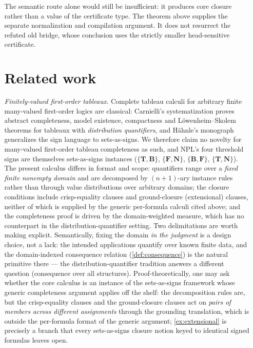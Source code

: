 \documentclass[11pt,a4paper]{article}
\theoremstyle{definition}
\newcommand{\vT}{\mathbf{T}}
\newcommand{\vF}{\mathbf{F}}
\newcommand{\vB}{\mathbf{B}}
\newcommand{\vN}{\mathbf{N}}
\begin{document}
The semantic route alone would still be insufficient: it produces core
closure rather than a value of the certificate type.  The theorem above
supplies the separate normalization and compilation argument.  It does not
resurrect the refuted old bridge, whose conclusion uses the strictly
smaller head-sensitive certificate.

\section{Related work}\label{sec:related}

\emph{Finitely-valued first-order tableaux.} Complete tableau calculi for
arbitrary finite many-valued first-order logics are classical:
Carnielli's systematization \cite{carnielli1987systematization} proves
abstract completeness, model existence, compactness and
L\"owenheim--Skolem theorems for tableaux with \emph{distribution
quantifiers}, and H\"ahnle's monograph \cite{haehnle1994automated}
generalizes the sign language to sets-as-signs. We therefore claim no
novelty for many-valued first-order tableau completeness as such, and
NPL's four threshold signs are themselves sets-as-signs instances
($\{\vT,\vB\}$, $\{\vF,\vN\}$, $\{\vB,\vF\}$, $\{\vT,\vN\}$). The present
calculus differs in format and scope: quantifiers range over a
\emph{fixed finite nonempty domain} and are decomposed by $(n{+}1)$-ary
instance rules rather than through value distributions over arbitrary
domains; the closure conditions include crisp-equality clauses and
ground-closure (extensional) clauses, neither of which is supplied by the
generic per-formula calculi cited above; and the completeness proof
is driven by the domain-weighted measure, which has no counterpart in the
distribution-quantifier setting. Two delimitations are worth making
explicit. Semantically, fixing the domain \emph{in the judgment} is a
design choice, not a lack: the intended applications quantify over known
finite data, and the domain-indexed consequence relation
(\cref{def:consequence}) is the natural primitive there — the
distribution-quantifier tradition answers a different question
(consequence over all structures). Proof-theoretically, one may ask
whether the core calculus is an instance of the sets-as-signs framework
whose generic completeness argument applies off the shelf: the
decomposition rules are, but the crisp-equality clauses and the
ground-closure clauses act on \emph{pairs of members across different
assignments} through the grounding translation, which is outside the
per-formula format of the generic argument; \cref{ex:extensional} is
precisely a branch that every sets-as-signs closure notion keyed to
identical signed formulas leaves open.
\end{document}
